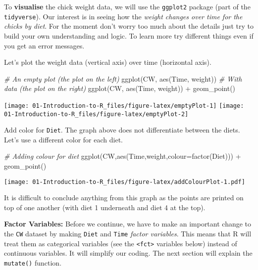 \documentclass[
]{book}
\newenvironment{Shaded}{\begin{snugshade}}{\end{snugshade}}
\newcommand{\AttributeTok}[1]{\textcolor[rgb]{0.77,0.63,0.00}{#1}}
\newcommand{\CommentTok}[1]{\textcolor[rgb]{0.56,0.35,0.01}{\textit{#1}}}
\newcommand{\FunctionTok}[1]{\textcolor[rgb]{0.00,0.00,0.00}{#1}}
\newcommand{\NormalTok}[1]{#1}
\newcommand{\SpecialCharTok}[1]{\textcolor[rgb]{0.00,0.00,0.00}{#1}}
\begin{document}
To \textbf{visualise} the chick weight data, we will use the \texttt{ggplot2} package (part of the
\texttt{tidyverse}). Our interest is in seeing how the \emph{weight changes over time for the chicks by
diet}. For the moment don't worry too much about the details just try to build your own
understanding and logic. To learn more try different things even if you get an error
messages.

Let's plot the weight data (vertical axis) over time (horizontal axis).

\begin{Shaded}
\begin{Highlighting}[]
\CommentTok{\# An empty plot (the plot on the left)}
\FunctionTok{ggplot}\NormalTok{(CW, }\FunctionTok{aes}\NormalTok{(Time, weight))  }
\CommentTok{\# With data (the plot on the right)}
\FunctionTok{ggplot}\NormalTok{(CW, }\FunctionTok{aes}\NormalTok{(Time, weight)) }\SpecialCharTok{+} \FunctionTok{geom\_point}\NormalTok{() }
\end{Highlighting}
\end{Shaded}

\begin{center}\texttt{[image: 01-Introduction-to-R\_files/figure-latex/emptyPlot-1]} \texttt{[image: 01-Introduction-to-R\_files/figure-latex/emptyPlot-2]} \end{center}

Add color for \texttt{Diet}. The graph above does not differentiate between the diets. Let's use a different color for
each diet.

\begin{Shaded}
\begin{Highlighting}[]
\CommentTok{\# Adding colour for diet}
\FunctionTok{ggplot}\NormalTok{(CW,}\FunctionTok{aes}\NormalTok{(Time,weight,}\AttributeTok{colour=}\FunctionTok{factor}\NormalTok{(Diet))) }\SpecialCharTok{+}
  \FunctionTok{geom\_point}\NormalTok{() }
\end{Highlighting}
\end{Shaded}

\texttt{[image: 01-Introduction-to-R\_files/figure-latex/addColourPlot-1.pdf]}

It is difficult to conclude anything from this graph as the points are printed on top of
one another (with diet 1 underneath and diet 4 at the top).

\textbf{Factor Variables:}
Before we continue, we have to make an important change to the \texttt{CW} dataset by making
\texttt{Diet} and \texttt{Time} \emph{factor variables}. This means that R will treat them as categorical
variables (see the \texttt{\textless{}fct\textgreater{}} variables below) instead of continuous variables. It will
simplify our coding. The next section will explain the \texttt{mutate()} function.
\end{document}
